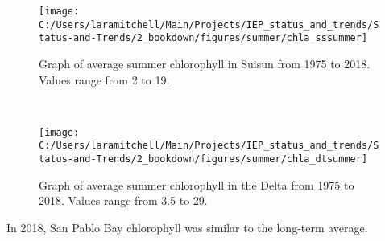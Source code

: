 \documentclass[
]{book}
\begin{document}
\begin{panel-grid}
\begin{columns-nocenter}
\begin{column40}
\end{column40}

\begin{column800}

\begin{expand}

\begin{figure}
\texttt{[image: C:/Users/laramitchell/Main/Projects/IEP\_status\_and\_trends/Status-and-Trends/2\_bookdown/figures/summer/chla\_sssummer]} \caption{Graph of average summer chlorophyll in Suisun from 1975 to 2018. Values range from 2 to 19.}\label{fig:unnamed-chunk-64}
\end{figure}

\end{expand}

\end{column800}

\begin{column40}

~

\end{column40}

\begin{column800}

\begin{expand}

\begin{figure}
\texttt{[image: C:/Users/laramitchell/Main/Projects/IEP\_status\_and\_trends/Status-and-Trends/2\_bookdown/figures/summer/chla\_dtsummer]} \caption{Graph of average summer chlorophyll in the Delta from 1975 to 2018. Values range from 3.5 to 29.}\label{fig:unnamed-chunk-65}
\end{figure}

\end{expand}

\end{column800}

\end{columns-nocenter}

\begin{columns-nocenter}

\begin{column800}

In 2018, San Pablo Bay chlorophyll was similar to the long-term average.

\end{column800}

\begin{column40}

~


\end{column40}
\end{columns-nocenter}
\end{panel-grid}
\end{document}
